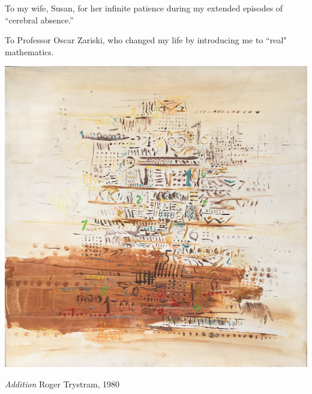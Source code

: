 %
%
%

\begin{dedication}
To my wife, Susan, for her infinite patience during my extended episodes of ``cerebral absence.''

\smallskip

\noindent
To Professor Oscar Zariski, who changed my life by introducing me to ``real" mathematics.
\end{dedication}

\vspace*{.25in}

\centerline{\includegraphics[scale=0.75]{AdditionForSpringer.png}}

\medskip

\centerline{{\large\em  Addition} \hspace*{4.5in} {\small Roger Trystram, 1980}}


